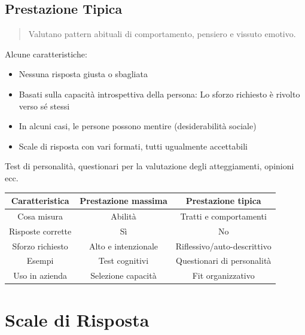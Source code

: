 \documentclass[compress]{beamer}
\begin{document}
\subsection{Prestazione Tipica}

\begin{frame}
	
	\begin{quote}
	Valutano pattern abituali di comportamento, pensiero e vissuto emotivo.	
	\end{quote}
	
	Alcune caratteristiche: 
	
	\begin{itemize}
		\item Nessuna risposta giusta o sbagliata
		\item Basati sulla capacità introspettiva della persona: Lo sforzo richiesto è rivolto verso sé stessi 
		\item	In alcuni casi, le persone possono mentire (desiderabilità sociale)
		\item	Scale di risposta con vari formati, tutti ugualmente accettabili
		
	\end{itemize}
	
	Test di personalità, questionari per la valutazione degli atteggiamenti, opinioni ecc. 
\end{frame}

\begin{frame}

\begin{table}
	\centering
	\begin{tabular}{c c c}
		\hline
		Caratteristica	&	Prestazione massima	&	Prestazione tipica	\\\hline
		Cosa misura	&	Abilità	&	Tratti e comportamenti	\\
		Risposte corrette	&	Sì	&	No	\\
		Sforzo richiesto	&	Alto e intenzionale	&	Riflessivo/auto-descrittivo	\\
		Esempi	&	Test cognitivi	&	Questionari di personalità	\\
		Uso in azienda	&	Selezione capacità	&	Fit organizzativo	\\\hline
	\end{tabular}
\end{table}
\end{frame}

\section[Scale di Risposta]{Scale di Risposta}
\end{document}
